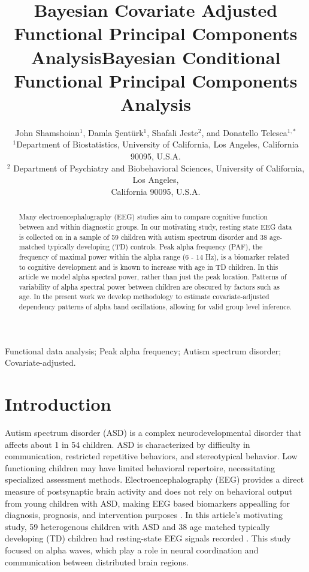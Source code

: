 \documentclass[useAMS,referee,usenatbib]{biom}
\title[This is an Example of Recto Running Head]{Bayesian Covariate Adjusted Functional Principal Components Analysis}
\author{John Shamshoian$^{1}$\email{donatello.telesca@ucla.edu}, Damla {\c S}ent{\"u}rk$^{1}$, Shafali Jeste$^{2}$, and Donatello Telesca$^{1,*}$ \\$^{1}$Department of Biostatistics, University of California, Los Angeles, California 90095, U.S.A.\\$^{2}$ Department of Psychiatry and Biobehavioral Sciences, University of California, Los Angeles,\\ California 90095, U.S.A.}
\title[Bayesian Conditional Functional Principal Components Analysis]{Bayesian Conditional Functional Principal Components Analysis}
\begin{document}
	

\label{firstpage}


\begin{abstract}
	Many electroencephalography (EEG) studies aim to compare cognitive function between and within diagnostic groups. In our motivating study, resting state EEG data is collected on in a sample of 59 children with autism spectrum disorder and 38 age-matched typically developing (TD) controls. Peak alpha frequency (PAF), the frequency of maximal power within the alpha range (6 - 14 Hz), is a biomarker related to cognitive development and is known to increase with age in TD children. In this article we model alpha spectral power, rather than just the peak location. Patterns of variability of alpha spectral power between children are obscured by factors such as age. In the present work we develop methodology to estimate covariate-adjusted dependency patterns of alpha band oscillations, allowing for valid group level inference.  
\end{abstract}

%

\begin{keywords}
	Functional data analysis; Peak alpha frequency; Autism spectrum disorder; Covariate-adjusted.
\end{keywords}


\maketitle


\section{Introduction}
\label{s:intro}
Autism spectrum disorder (ASD) is a complex neurodevelopmental disorder that affects about 1 in 54 children. ASD is characterized by difficulty in communication, restricted repetitive behaviors, and stereotypical behavior. Low functioning children may have limited behavioral repertoire, necessitating specialized assessment methods. Electroencephalography (EEG) provides a direct measure of postsynaptic brain activity and does not rely on behavioral output from young children with ASD, making EEG based biomarkers appealling for diagnosis, prognosis, and intervention purposes \citep*{Jeste2015}. In this article's motivating study, 59 heterogenous children with ASD and 38 age matched typically developing (TD) children had resting-state EEG signals recorded \citep*{Dickinson2017}. This study focused on alpha waves, which play a role in neural coordination and communication between distributed brain regions.
\end{document}
